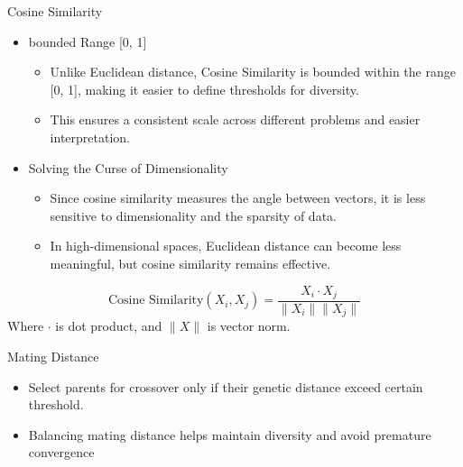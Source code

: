     \begin{frame}{Cosine Similarity}
        \begin{itemize}
            \item bounded Range [0, 1]
                \begin{itemize}
                    \item Unlike Euclidean distance, Cosine Similarity is bounded within the range [0, 1], making it easier to define thresholds for diversity.
                    \item This ensures a consistent scale across different problems and easier interpretation.
                \end{itemize}
            \item Solving the Curse of Dimensionality
                \begin{itemize}
                    \item Since cosine similarity measures the angle between vectors, it is less sensitive to dimensionality and the sparsity of data.
                    \item In high-dimensional spaces, Euclidean distance can become less meaningful, but cosine similarity remains effective.
                \end{itemize}
        \end{itemize}
        \vspace{-5pt}
        \begin{center}
            \begin{equation*}
                \textrm{Cosine Similarity}(X_i, X_j) = \frac{X_i \cdot X_j}{ \|X_i\| \|X_j\| }
            \end{equation*}
            Where $\cdot$ is dot product, and $\| X \|$ is vector norm.
        \end{center}
    \end{frame}

    \begin{frame}{Mating Distance}
        \begin{itemize}
            \item Select parents for crossover only if their genetic distance exceed certain threshold.
            \item Balancing mating distance helps maintain diversity and avoid premature convergence
        \end{itemize}
    \end{frame}
    

